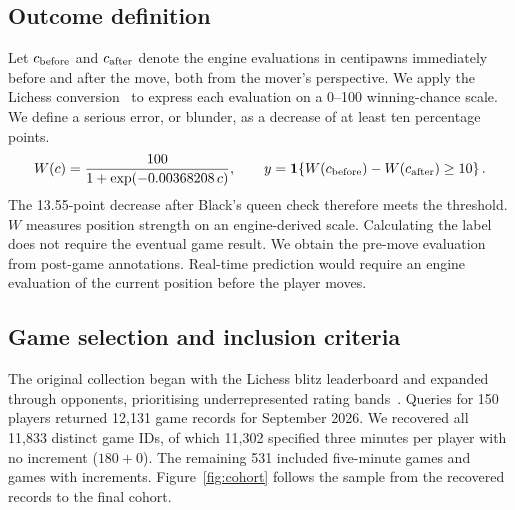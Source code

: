 \documentclass[10pt,a4paper]{article}
\begin{document}
\subsection{Outcome definition}
Let \(c_{\rm before}\) and \(c_{\rm after}\) denote the engine evaluations in centipawns immediately before and after the move, both from the mover's perspective. We apply the Lichess conversion~\cite{lichesswin} to express each evaluation on a 0--100 winning-chance scale. We define a serious error, or blunder, as a decrease of at least ten percentage points.
\begin{equation}
 W(c)=\frac{100}{1+\exp(-0.00368208\,c)}, \qquad
 y=\mathbf{1}\!\left\{W(c_{\rm before})-W(c_{\rm after})\geq 10\right\}.
 \label{eq:outcome}
\end{equation}
The 13.55-point decrease after Black's queen check therefore meets the threshold. \(W\) measures position strength on an engine-derived scale. Calculating the label does not require the eventual game result. We obtain the pre-move evaluation from post-game annotations. Real-time prediction would require an engine evaluation of the current position before the player moves.

\subsection{Game selection and inclusion criteria}
The original collection began with the Lichess blitz leaderboard and expanded through opponents, prioritising underrepresented rating bands~\cite{lichessapi}. Queries for 150 players returned 12,131 game records for September 2026. We recovered all 11,833 distinct game IDs, of which 11,302 specified three minutes per player with no increment (\(180+0\)). The remaining 531 included five-minute games and games with increments. Figure~\ref{fig:cohort} follows the sample from the recovered records to the final cohort.
\end{document}
